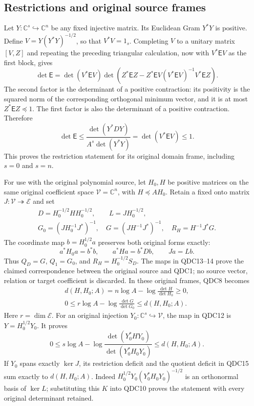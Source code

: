 \subsection{Restrictions and original source frames}

Let $Y:\mathbb C^s\hookrightarrow\mathbb C^n$ be any fixed injective
matrix. Its Euclidean Gram $Y^*Y$ is positive. Define
$V=Y(Y^*Y)^{-1/2}$, so that $V^*V=1_s$. Completing $V$ to a
unitary matrix $[V,Z]$ and repeating the preceding triangular
calculation, now with $V^*\mathsf EV$ as the first block, gives
\[
 \det\mathsf E=\det(V^*\mathsf EV)\det
 \left(Z^*\mathsf EZ
       -Z^*\mathsf EV(V^*\mathsf EV)^{-1}V^*\mathsf EZ\right).
 \tag{QDC11}
\]
The second factor is the determinant of a positive contraction:
its positivity is the squared norm of the corresponding
orthogonal minimum vector, and it is at most $Z^*\mathsf EZ\preceq1$.
The first factor is also the determinant of a positive contraction.
Therefore
\[
 \boxed{\displaystyle
 \det\mathsf E\le
 \frac{\det(Y^*DY)}{A^s\det(Y^*Y)}
 =\det(V^*\mathsf EV)\le1 .}
 \tag{QDC12}
\]
This proves the restriction statement for its original domain
frame, including $s=0$ and $s=n$.

For use with the original polynomial source, let $H_0,H$ be
positive matrices on the same original coefficient space
$\mathcal V=\mathbb C^n$, with $H\preceq AH_0$. Retain a fixed
onto matrix $J:\mathcal V\twoheadrightarrow\mathcal E$ and set
\[
 \begin{gathered}
 D=H_0^{-1/2}HH_0^{-1/2},\qquad L=JH_0^{-1/2},\\
 G_0=(JH_0^{-1}J^*)^{-1},\quad
 G=(JH^{-1}J^*)^{-1},\quad
 R_H=H^{-1}J^*G.
 \end{gathered}
 \tag{QDC13}
\]
The coordinate map $b=H_0^{1/2}a$ preserves both original
forms exactly:
\[
 a^*H_0a=b^*b,\qquad a^*Ha=b^*Db,\qquad Ja=Lb.
 \tag{QDC14}
\]
Thus $Q_D=G$, $Q_1=G_0$, and $R_H=H_0^{-1/2}S_D$.
The maps in QDC13--14 prove the claimed correspondence between
the original source and QDC1; no source vector, relation or
target coefficient is discarded. In these original frames,
QDC8 becomes
\[
 \begin{gathered}
 d(H,H_0;A)=n\log A-\log\frac{\det H}{\det H_0}\ge0,\\
 0\le
 r\log A-\log\frac{\det G}{\det G_0}
 \le d(H,H_0;A).
 \end{gathered}
 \tag{QDC15}
\]
Here $r=\dim\mathcal E$. For an original injection
$Y_0:\mathbb C^s\hookrightarrow\mathcal V$, the map in QDC12
is $Y=H_0^{1/2}Y_0$. It proves
\[
 0\le s\log A
       -\log\frac{\det(Y_0^*HY_0)}{\det(Y_0^*H_0Y_0)}
 \le d(H,H_0;A).
 \tag{QDC16}
\]
If $Y_0$ spans exactly $\ker J$, its restriction deficit and
the quotient deficit in QDC15 sum exactly to $d(H,H_0;A)$.
Indeed $H_0^{1/2}Y_0(Y_0^*H_0Y_0)^{-1/2}$ is an orthonormal
basis of $\ker L$; substituting this $K$ into QDC10 proves
the statement with every original determinant retained.

